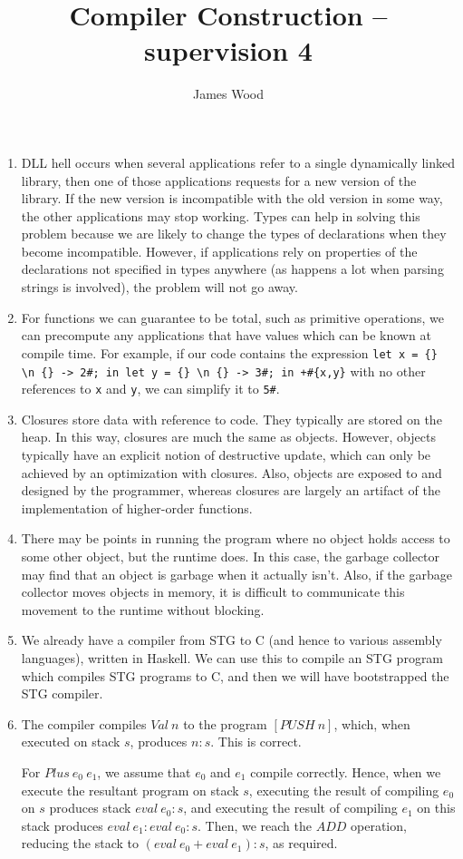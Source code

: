 \documentclass{article}
\begin{document}
\title{Compiler Construction -- supervision 4}
\author{James Wood}
\maketitle

\begin{enumerate}
  \item DLL hell occurs when several applications refer to a single dynamically linked library, then one of those applications requests for a new version of the library. If the new version is incompatible with the old version in some way, the other applications may stop working. Types can help in solving this problem because we are likely to change the types of declarations when they become incompatible. However, if applications rely on properties of the declarations not specified in types anywhere (as happens a lot when parsing strings is involved), the problem will not go away.
  \item For functions we can guarantee to be total, such as primitive operations, we can precompute any applications that have values which can be known at compile time. For example, if our code contains the expression \texttt{let x = \{\} \textbackslash n \{\} -> 2\#; in let y = \{\} \textbackslash n \{\} -> 3\#; in +\#\{x,y\}} with no other references to \texttt{x} and \texttt{y}, we can simplify it to \texttt{5\#}.
  \item Closures store data with reference to code. They typically are stored on the heap. In this way, closures are much the same as objects. However, objects typically have an explicit notion of destructive update, which can only be achieved by an optimization with closures. Also, objects are exposed to and designed by the programmer, whereas closures are largely an artifact of the implementation of higher-order functions.
  \item There may be points in running the program where no object holds access to some other object, but the runtime does. In this case, the garbage collector may find that an object is garbage when it actually isn't. Also, if the garbage collector moves objects in memory, it is difficult to communicate this movement to the runtime without blocking.
  \item We already have a compiler from STG to C (and hence to various assembly languages), written in Haskell. We can use this to compile an STG program which compiles STG programs to C, and then we will have bootstrapped the STG compiler.
  \item
    The compiler compiles $\mathit{Val}~n$ to the program $[\mathit{PUSH}~n]$, which, when executed on stack $s$, produces $n : s$. This is correct.

    For $\mathit{Plus}~e_0~e_1$, we assume that $e_0$ and $e_1$ compile correctly. Hence, when we execute the resultant program on stack $s$, executing the result of compiling $e_0$ on $s$ produces stack $\mathit{eval}~e_0 : s$, and executing the result of compiling $e_1$ on this stack produces $\mathit{eval}~e_1 : \mathit{eval}~e_0 : s$. Then, we reach the $\mathit{ADD}$ operation, reducing the stack to $(\mathit{eval}~e_0 + \mathit{eval}~e_1) : s$, as required.
\end{enumerate}
\end{document}
